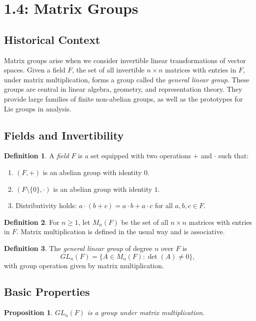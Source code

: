 \documentclass[12pt]{article}
\newtheorem{proposition}[theorem]{Proposition}
\theoremstyle{definition}
\newtheorem{definition}{Definition}
\begin{document}
\newpage

\dotfill
\section*{1.4: Matrix Groups}
\dotfill

\subsection*{Historical Context}
Matrix groups arise when we consider invertible linear transformations of vector spaces.
Given a field $F$, the set of all invertible $n\times n$ matrices with entries in $F$,
under matrix multiplication, forms a group called the \emph{general linear group}.
These groups are central in linear algebra, geometry, and representation theory.
They provide large families of finite non-abelian groups, as well as the prototypes
for Lie groups in analysis.

\subsection*{Fields and Invertibility}
\begin{definition}
A \emph{field} $F$ is a set equipped with two operations $+$ and $\cdot$ such that:
\begin{enumerate}
    \item $(F,+)$ is an abelian group with identity $0$.
    \item $(F\setminus\{0\},\cdot)$ is an abelian group with identity $1$.
    \item Distributivity holds: $a\cdot(b+c) = a\cdot b + a\cdot c$ for all $a,b,c\in F$.
\end{enumerate}
\end{definition}

\begin{definition}
For $n\geq 1$, let $M_n(F)$ be the set of all $n\times n$ matrices with entries in $F$.
Matrix multiplication is defined in the usual way and is associative.
\end{definition}

\begin{definition}
The \emph{general linear group} of degree $n$ over $F$ is
\[
GL_n(F) = \{A\in M_n(F) : \det(A)\neq 0\},
\]
with group operation given by matrix multiplication.
\end{definition}

\subsection*{Basic Properties}
\begin{proposition}
$GL_n(F)$ is a group under matrix multiplication.
\end{proposition}
\end{document}
